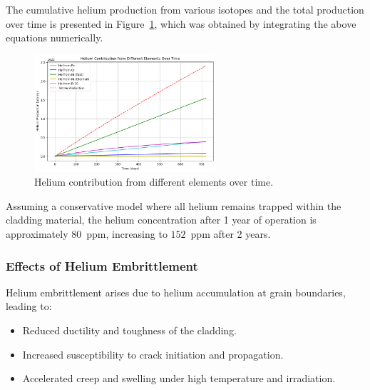 The cumulative helium production from various isotopes and the total production over time is presented in Figure~\ref{fig:helium_production}, which was obtained by integrating the above equations numerically.

\begin{figure}[H]
    \centering
    \includegraphics[width=0.6\textwidth]{He_production.png}
    \caption{Helium contribution from different elements over time.}
    \label{fig:helium_production}
\end{figure}

Assuming a conservative model where all helium remains trapped within the cladding material, the helium concentration after 1 year of operation is approximately $80$~ppm, increasing to $152$~ppm after 2 years.

\subsubsection{Effects of Helium Embrittlement}

Helium embrittlement arises due to helium accumulation at grain boundaries, leading to:
\begin{itemize}
    \item Reduced ductility and toughness of the cladding.
    \item Increased susceptibility to crack initiation and propagation.
    \item Accelerated creep and swelling under high temperature and irradiation.
\end{itemize}